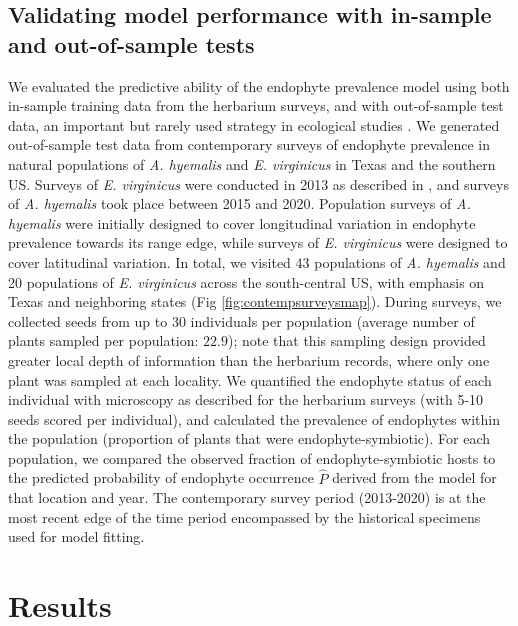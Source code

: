\documentclass[11pt]{article}
\let\cite\citep
\begin{document}
\subsection*{Validating model performance with in-sample and out-of-sample tests}
We evaluated the predictive ability of the endophyte prevalence model using both in-sample training data from the herbarium surveys, and with out-of-sample test data, an important but rarely used strategy in ecological studies \cite{tredennick2021practical, lee2024phenological}.
We generated out-of-sample test data from contemporary surveys of endophyte prevalence in natural populations of \emph{A. hyemalis} and \emph{E. virginicus} in Texas and the southern US. 
Surveys of \emph{E. virginicus} were conducted in 2013 as described in \citet{sneck2017variation}, and surveys of \emph{A. hyemalis} took place between 2015 and 2020.
Population surveys of \emph{A. hyemalis} were initially designed to cover longitudinal variation in endophyte prevalence towards its range edge, while surveys of \emph{E. virginicus} were designed to cover latitudinal variation. 
In total, we visited 43 populations of \emph{A. hyemalis} and 20 populations of \emph{E. virginicus} across the south-central US, with emphasis on Texas and neighboring states (Fig \ref{fig:contempsurveysmap}).
During surveys, we collected seeds from up to 30 individuals per population (average number of plants sampled per population: $22.9$); note that this sampling design provided greater local depth of information than the herbarium records, where only one plant was sampled at each locality.
We quantified the endophyte status of each individual with microscopy as described for the herbarium surveys (with 5-10 seeds scored per individual), and calculated the prevalence of endophytes within the population (proportion of plants that were endophyte-symbiotic).
For each population, we compared the observed fraction of endophyte-symbiotic hosts to the predicted probability of endophyte occurrence $\hat{P}$ derived from the model for that location and year. 
The contemporary survey period (2013-2020) is at the most recent edge of the time period encompassed by the historical specimens used for model fitting.

		
\section*{Results}
\end{document}
